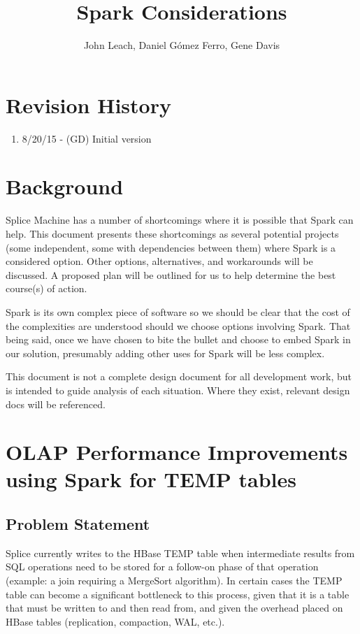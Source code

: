 \documentclass{article}
\begin{document}
\title{Spark Considerations}
\author{John Leach, Daniel G\'{o}mez Ferro, Gene Davis}
\maketitle
\makeauthor
\thispagestyle{fancy}

\section{Revision History}
\begin{enumerate}
  \item 8/20/15 - (GD) Initial version
\end{enumerate}
\section{Background}
Splice Machine has a number of shortcomings where it is possible that Spark can help.  This document presents these shortcomings as several potential projects (some independent, some with dependencies between them) where Spark is a considered option.  Other options, alternatives, and workarounds will be discussed.  A proposed plan will be outlined for us to help determine the best course(s) of action.  

Spark is its own complex piece of software so we should be clear that the cost of the complexities are understood should we choose options involving Spark.  That being said, once we have chosen to bite the bullet and choose to embed Spark in our solution, presumably adding other uses for Spark will be less complex.

This document is not a complete design document for all development work, but is intended to guide analysis of each situation.  Where they exist, relevant design docs will be referenced.  

\section{OLAP Performance Improvements using Spark for TEMP tables}

\subsection{Problem Statement}

Splice currently writes to the HBase TEMP table when intermediate results from SQL operations need to be stored for a follow-on phase of that operation (example: a join requiring a MergeSort algorithm).  In certain cases the TEMP table can become a significant bottleneck to this process, given that it is a table that must be written to and then read from, and given the overhead placed on HBase tables (replication, compaction, WAL, etc.).  
\end{document}
